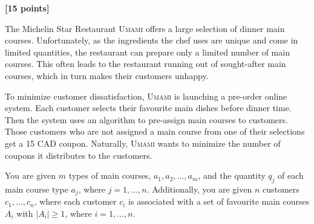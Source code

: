 \documentclass{assignment-373}
\begin{document}
\think


\textbf{[15 points]}

The Michelin Star Restaurant \textsc{Umami} offers a large selection of dinner main courses. Unfortunately, as the ingredients the chef uses are unique and come in limited quantities, the restaurant can prepare only a limited number of main courses. This often leads to the restaurant running out of sought-after main courses, which in turn makes their customers unhappy.

To minimize customer dissatisfaction, \textsc{Umami} is launching a pre-order online system. Each customer selects their favourite main dishes before dinner time. Then the system uses an algorithm to pre-assign main courses to customers. Those customers who are not assigned a main course from one of their selections get a 15 CAD coupon. Naturally, \textsc{Umami} wants to minimize the number of coupons it distributes to the customers.

You are given $m$ types of main courses, $a_1, a_2, \ldots, a_m$, and the quantity $q_j$ of each main course type $a_j$, where $j = 1, \ldots, n$. Additionally, you are given $n$ customers $c_1, \ldots, c_n$, where each customer $c_i$ is associated with a set of favourite main courses $A_i$ with $|A_i| \geq 1$, where $i = 1, \ldots, n$. 
\end{document}
